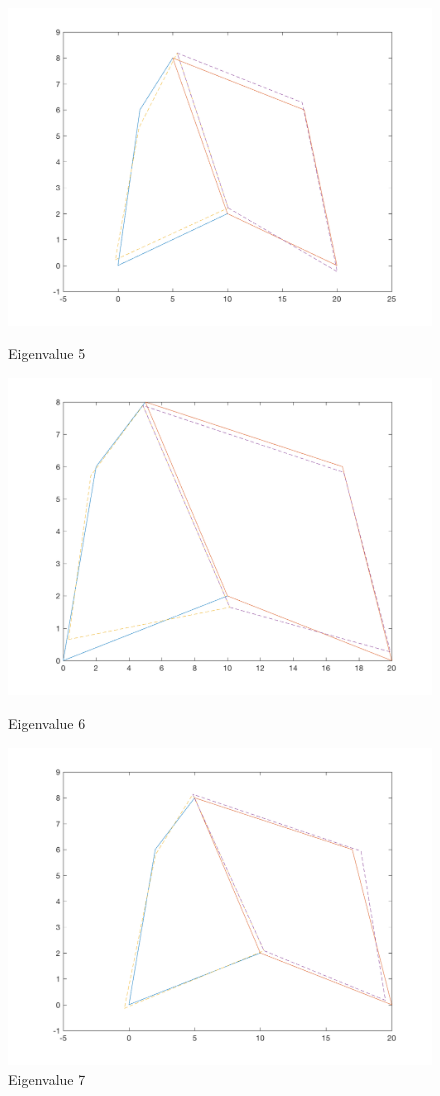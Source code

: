 \documentclass[11pt]{amsart}
\begin{document}
\begin{figure}[H] 
  \label{fig2} 
  \begin{minipage}[b]{0.5\linewidth}
    \centering
    \includegraphics[width=.5\linewidth]{eigenvectors/eigenvector_5_fullint.png} 
    \caption{Eigenvalue 5} 
    \vspace{4ex}
  \end{minipage}%
  \begin{minipage}[b]{0.5\linewidth}
    \centering
    \includegraphics[width=.5\linewidth]{eigenvectors/eigenvector_6_fullint.png} 
    \caption{Eigenvalue 6} 
    \vspace{4ex}
  \end{minipage} 
  \begin{minipage}[b]{0.5\linewidth}
    \centering
    \includegraphics[width=.5\linewidth]{eigenvectors/eigenvector_7_fullint.png} 
    \caption{Eigenvalue 7} 
    \vspace{4ex}
  \end{minipage}%
  \begin{minipage}[b]{0.5\linewidth}

\end{minipage}
\end{figure}
\end{document}
